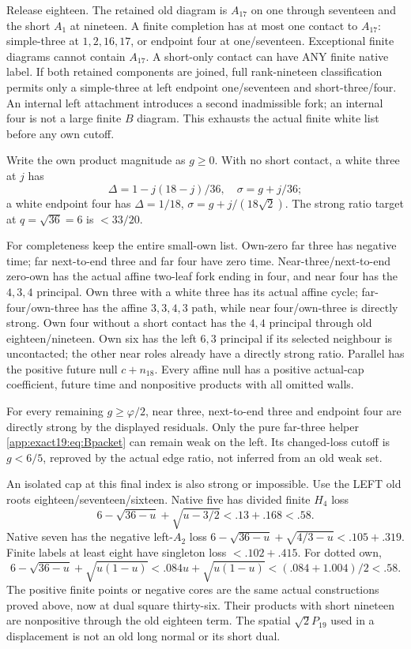 Release eighteen.
The retained old diagram is
\(A_{17}\) on one through seventeen
and the short \(A_1\) at nineteen.
A finite completion has at most
one contact to \(A_{17}\):
simple-three at \(1,2,16,17\),
or endpoint four at one/seventeen.
Exceptional finite diagrams cannot
contain \(A_{17}\).
A short-only contact can have ANY
finite native label.
If both retained components are
joined, full rank-nineteen
classification permits only a
simple-three at left endpoint
one/seventeen and short-three/four.
An internal left attachment
introduces a second inadmissible
fork; an internal four is not a
large finite \(B\) diagram.
This exhausts the actual finite
white list before any own cutoff.

Write the own product magnitude
as \(g\ge0\).
With no short contact, a white
three at \(j\) has
\[
 \Delta=1-j(18-j)/36,\quad\sigma=g+j/36;
\]
a white endpoint four has
\(\Delta=1/18\),
\(\sigma=g+j/(18\sqrt2)\).
The strong ratio target at
\(q=\sqrt{36}=6\) is \(<33/20\).

For completeness keep the entire
small-own list.
Own-zero far three has negative
time; far next-to-end three and
far four have zero time.
Near-three/next-to-end zero-own
has the actual affine two-leaf
fork ending in four, and near
four has the \(4,3,4\) principal.
Own three with a white three
has its actual affine cycle;
far-four/own-three has the affine
\(3,3,4,3\) path, while near
four/own-three is directly strong.
Own four without a short contact
has the \(4,4\) principal through
old eighteen/nineteen.
Own six has the left \(6,3\)
principal if its selected neighbour
is uncontacted; the other near
roles already have a directly
strong ratio.
Parallel has the positive future
null \(c+n_{18}\).
Every affine null has a positive
actual-cap coefficient, future
time and nonpositive products
with all omitted walls.

For every remaining \(g\ge\varphi/2\),
near three, next-to-end three
and endpoint four are directly
strong by the displayed residuals.
Only the pure far-three helper
\eqref{app:exact19:eq:Bpacket}
can remain weak on the left.
Its changed-loss cutoff is
\(g<6/5\), reproved by the actual
edge ratio, not inferred from an
old weak set.

An isolated cap at this final
index is also strong or impossible.
Use the LEFT old roots
eighteen/seventeen/sixteen.
Native five has divided finite
\(H_4\) loss
\[
        6-\sqrt{36-u}+\sqrt{u-3/2}<.13+.168<.58 .
\]
Native seven has the negative
left-\(A_2\) loss
\(6-\sqrt{36-u}+\sqrt{4/3-u}<.105+.319\).
Finite labels at least eight
have singleton loss
\(<.102+.415\).
For dotted own,
\[
 6-\sqrt{36-u}+\sqrt{u(1-u)}
       <.084u+\sqrt{u(1-u)}
       <(.084+1.004)/2<.58 .
\]
The positive finite points or
negative cores are the same actual
constructions proved above, now
at dual square thirty-six.
Their products with short nineteen
are nonpositive through the old
eighteen term.
The spatial \(\sqrt2P_{19}\) used
in a displacement is not an old
long normal or its short dual.

